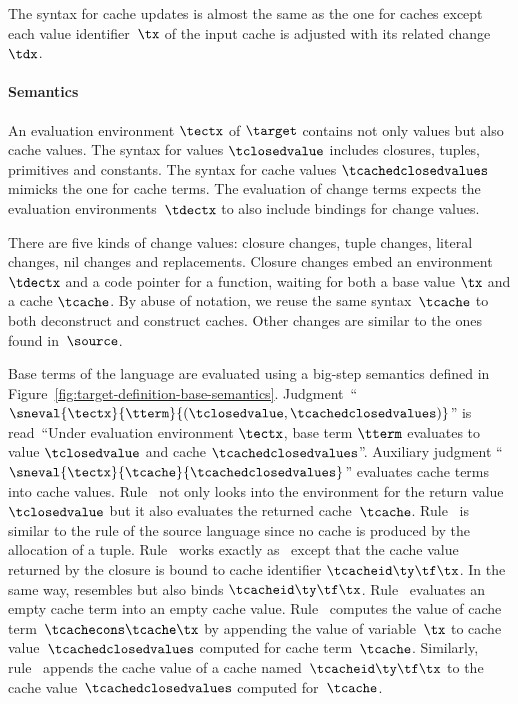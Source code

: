 The syntax for cache updates is almost the same as the one for caches
except each value identifier~$\tx$ of the input cache is adjusted with
its related change~$\tdx$.

\paragraph{Semantics}
An evaluation environment $\tectx$ of $\target$ contains not only
values but also cache values. The syntax for values $\tclosedvalue$
includes closures, tuples, primitives and constants. The syntax for
cache values $\tcachedclosedvalues$ mimicks the one for cache terms.
The evaluation of change terms expects the evaluation
environments~$\tdectx$ to also include bindings for change values.

There are five kinds of change values: closure changes, tuple changes,
literal changes, nil changes and replacements.  Closure changes embed
an environment $\tdectx$ and a code pointer for a function,
waiting for both a base value $\tx$ and a cache $\tcache$. By abuse of notation,
we reuse the same syntax~$\tcache$ to both deconstruct and
construct caches. Other changes are similar to the ones found
in~$\source$.

Base terms of the language are evaluated using a big-step
semantics defined in Figure~\ref{fig:target-definition-base-semantics}.
Judgment~``$\sneval{\tectx}{\tterm}{(\tclosedvalue,
  \tcachedclosedvalues)}$'' is read~``Under evaluation environment
$\tectx$, base term $\tterm$ evaluates to value
$\tclosedvalue$ and cache $\tcachedclosedvalues$''. Auxiliary
judgment ``$\sneval{\tectx}{\tcache}{\tcachedclosedvalues}$''
evaluates cache terms into cache values.
%
Rule~ not only looks into the environment
for the return value~$\tclosedvalue$ but it also evaluates
the returned cache~$\tcache$.
%
Rule~ is similar to the rule of the source
language since no cache is produced by the allocation of a tuple.
%
Rule~ works exactly
as~ except that the cache value returned by the
closure is bound to cache identifier $\tcacheid\ty\tf\tx$.
In the same way,  resembles 
but also binds $\tcacheid\ty\tf\tx$.
%
Rule~ evaluates an empty cache term into an
empty cache value. Rule~ computes the value of
cache term~$\tcachecons\tcache\tx$ by appending the value of
variable~$\tx$ to cache value~$\tcachedclosedvalues$ computed for
cache term~$\tcache$. Similarly,
rule~ appends the cache value of a cache
named~$\tcacheid\ty\tf\tx$ to the cache value~$\tcachedclosedvalues$
computed for~$\tcache$.

